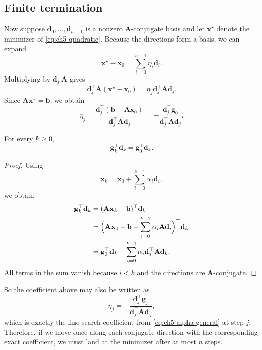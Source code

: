 \subsection{Finite termination}
Now suppose
$\mathbf{d}_0,\ldots,\mathbf{d}_{n-1}$ is a nonzero $\mathbf{A}$-conjugate
basis and let $\mathbf{x}^\star$ denote the minimizer of
\eqref{eq:ch5-quadratic}. Because the directions form a basis, we can expand
\[
  \mathbf{x}^\star-\mathbf{x}_0=\sum_{i=0}^{n-1}\eta_i \mathbf{d}_i.
\]
Multiplying by $\mathbf{d}_j^{\top}\mathbf{A}$ gives
\[
  \mathbf{d}_j^{\top}\mathbf{A}(\mathbf{x}^\star-\mathbf{x}_0)
  =\eta_j \mathbf{d}_j^{\top}\mathbf{A}\mathbf{d}_j.
\]
Since $\mathbf{A}\mathbf{x}^\star=\mathbf{b}$, we obtain
\[
  \eta_j
  =\frac{\mathbf{d}_j^{\top}(\mathbf{b}-\mathbf{A}\mathbf{x}_0)}
  {\mathbf{d}_j^{\top}\mathbf{A}\mathbf{d}_j}
  =-\frac{\mathbf{d}_j^{\top}\mathbf{g}_0}
  {\mathbf{d}_j^{\top}\mathbf{A}\mathbf{d}_j}.
\]
\begin{claim}
\label{clm:ch5-g0-gk-direction}
For every $k\ge 0$,
\[
  \mathbf{g}_k^{\top}\mathbf{d}_k=\mathbf{g}_0^{\top}\mathbf{d}_k.
\]
\end{claim}
\begin{proof}
Using
\[
  \mathbf{x}_k=\mathbf{x}_0+\sum_{i=0}^{k-1}\alpha_i \mathbf{d}_i,
\]
we obtain
\begin{align*}
  \mathbf{g}_k^{\top}\mathbf{d}_k
  &= (\mathbf{A}\mathbf{x}_k-\mathbf{b})^{\top}\mathbf{d}_k \\
  &= \Bigl(\mathbf{A}\mathbf{x}_0-\mathbf{b}
  +\sum_{i=0}^{k-1}\alpha_i \mathbf{A}\mathbf{d}_i\Bigr)^{\top}\mathbf{d}_k \\
  &= \mathbf{g}_0^{\top}\mathbf{d}_k
  +\sum_{i=0}^{k-1}\alpha_i \mathbf{d}_i^{\top}\mathbf{A}\mathbf{d}_k.
\end{align*}
All terms in the sum vanish because $i<k$ and the directions are
$\mathbf{A}$-conjugate.
\end{proof}

So the coefficient above may also be written as
\[
  \eta_j
  =-\frac{\mathbf{d}_j^{\top}\mathbf{g}_j}
  {\mathbf{d}_j^{\top}\mathbf{A}\mathbf{d}_j},
\]
which is exactly the line-search coefficient from \eqref{eq:ch5-alpha-general}
at step $j$. Therefore, if we move once along each conjugate direction with
the corresponding exact coefficient, we must land at the minimizer after at
most $n$ steps.

